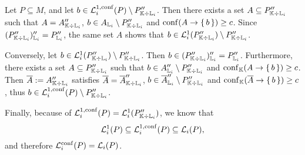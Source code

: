 \begin{Proof}
  Let $P \subseteq M$, and let $b \in \mathcal{L}_{i}^{1,\operatorname{conf}}(P) \setminus P_{{\mathbb{K}}
    \div {\ensuremath{\mathbb{L}}}_{i}}''$.  Then there exists a set $A \subseteq P_{{\mathbb{K}} \div {\ensuremath{\mathbb{L}}}_{i}}''$ such that $A = A_{{\mathbb{K}} \div {\ensuremath{\mathbb{L}}}_{i}}''$, $b \in A_{{\mathbb{L}}_{i}}
  \setminus P_{{\mathbb{K}} \div {\ensuremath{\mathbb{L}}}_{i}}''$ and $\operatorname{conf} (A \to {\ensuremath{\{\,b\,\}}}) \ge c$.  Since
  $(P_{{\mathbb{K}} \div {\ensuremath{\mathbb{L}}}_{i}}'')_{{\mathbb{L}}_{i}}'' = P_{{\mathbb{L}}_{i}}''$, the same set $A$
  shows that $b \in \mathcal{L}_{i}^{1}(P_{{\mathbb{K}} \div {\ensuremath{\mathbb{L}}}_{i}}'') \setminus P_{{\mathbb{K}}
    \div {\ensuremath{\mathbb{L}}}_{i}}''$.

  Conversely, let $b \in \mathcal{L}_{i}^{1}(P_{{\mathbb{K}} \div {\ensuremath{\mathbb{L}}}_{i}}'') \setminus
  P_{{\mathbb{K}} \div {\ensuremath{\mathbb{L}}}_{i}}''$.  Then $b \in (P_{{\mathbb{K}} \div {\ensuremath{\mathbb{L}}}_{i}}'')_{{\mathbb{L}}_{i}}'' = P_{{\mathbb{L}}_{i}}''$.  Furthermore, there exists a set $A \subseteq P_{{\mathbb{K}}
    \div {\ensuremath{\mathbb{L}}}_{i}}''$ such that $b \in A_{{\mathbb{L}}_{i}}'' \setminus P_{{\mathbb{K}} \div {\ensuremath{\mathbb{L}}}_{i}}''$ and $\operatorname{conf}_{{\mathbb{K}}}(A \to {\ensuremath{\{\, b \,\}}}) \ge c$.  Then $\overline A := A_{{\mathbb{K}} \div
    {\ensuremath{\mathbb{L}}}_{i}}''$ satisfies $\overline A = \overline A_{{\mathbb{K}} \div {\ensuremath{\mathbb{L}}}_{i}}''$, $b \in \overline
  A_{{\mathbb{L}}_{i}}'' \setminus P_{{\mathbb{K}} \div {\ensuremath{\mathbb{L}}}_{i}}''$ and $\operatorname{conf}_{{\mathbb{K}}}(\overline A \to
  {\ensuremath{\{\,b\,\}}}) \ge c$, thus $b \in \mathcal{L}_{i}^{1,\operatorname{conf}}(P)\setminus P_{{\mathbb{K}} \div {\ensuremath{\mathbb{L}}}_{i}}''$.

  Finally, because of $\mathcal{L}_{i}^{1,\operatorname{conf}}(P) = \mathcal{L}_{i}^{1}(P_{{\mathbb{K}} \div
    {\ensuremath{\mathbb{L}}}_{i}}'')$, we know that
  \begin{equation*}
    \mathcal{L}_{i}^{1}(P) \subseteq \mathcal{L}_{i}^{1,\operatorname{conf}}(P) \subseteq \mathcal{L}_{i}(P),
  \end{equation*}
  and therefore $\mathcal{L}_{i}^{\operatorname{conf}}(P) = \mathcal{L}_{i}(P)$.
\end{Proof}

